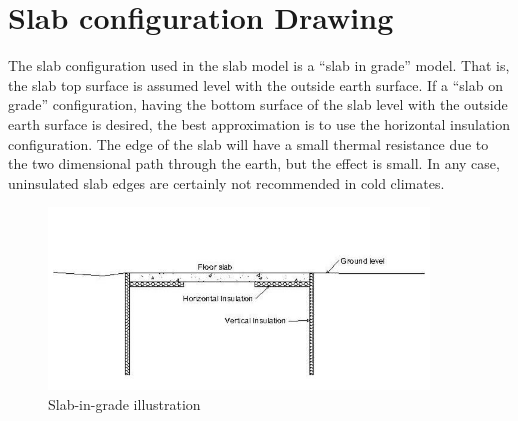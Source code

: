\section{Slab configuration Drawing}\label{slab-configuration-drawing}

The slab configuration used in the slab model is a ``slab in grade'' model. That is, the slab top surface is assumed level with the outside earth surface. If a ``slab on grade'' configuration, having the bottom surface of the slab level with the outside earth surface is desired, the best approximation is to use the horizontal insulation configuration. The edge of the slab will have a small thermal resistance due to the two dimensional path through the earth, but the effect is small. In any case, uninsulated slab edges are certainly not recommended in cold climates.

\begin{figure}[hbtp] %
\centering
\includegraphics[width=0.9\textwidth, height=0.9\textheight, keepaspectratio=true]{media/image018.jpg}
\caption{Slab-in-grade illustration \protect \label{fig:slab-in-grade-illustration}}
\end{figure}

